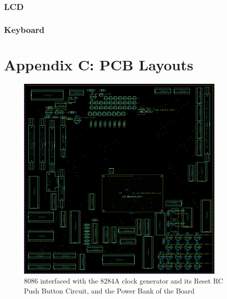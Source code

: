             \subsubsection{LCD} \label{sec:lcd_asm}

            \newpage
            \subsubsection{Keyboard} \label{sec:keybrd_asm}


    \clearpage
    \newpage

    \section{Appendix C: PCB Layouts} \label{appendix:pcb}

        \begin{figure}[ht]
            \begin{center}
                \includegraphics[width=0.9\textwidth]{figures/main.png}
                \caption{8086 interfaced with the 8284A clock generator and its Reset RC Push Button Circuit, and the Power Bank of the Board} \label{fig:main}
            \end{center}
        \end{figure}


